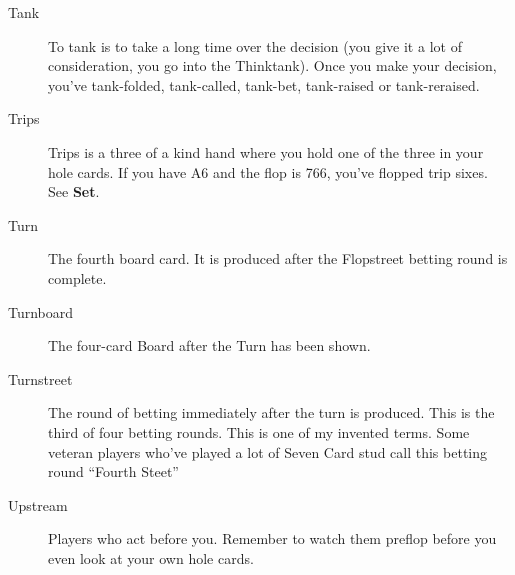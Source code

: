 \begin{description}
\item[Tank] To tank is to take a long time over the decision
(you give it a lot of consideration, you go into the Thinktank).
Once you make your decision, you've tank-folded, tank-called, tank-bet,
tank-raised or tank-reraised.

\item[Trips] Trips is a three of a kind hand where you hold one of the
three in your hole cards. If you have A6 and the flop is 766, you've
flopped trip sixes. See \textbf{Set}.

\item[Turn] The fourth board card. It is produced after the Flopstreet
betting round is complete.

\item[Turnboard] The four-card Board after the Turn has been shown.

\item[Turnstreet] The round of betting immediately after the turn is
produced. This is the third of four betting rounds. This is one
of my invented terms. Some veteran players who've played a lot of
Seven Card stud call this betting round ``Fourth Steet''

\item[Upstream] Players who act before you. Remember to watch them
preflop before you even look at your own hole cards.

\end{description}
